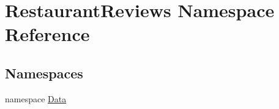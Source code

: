 \hypertarget{namespace_restaurant_reviews}{}\section{Restaurant\+Reviews Namespace Reference}
\label{namespace_restaurant_reviews}
\subsection*{Namespaces}
\begin{DoxyCompactItemize}
\item 
namespace \hyperlink{namespace_restaurant_reviews_1_1_data}{Data}
\end{DoxyCompactItemize}
